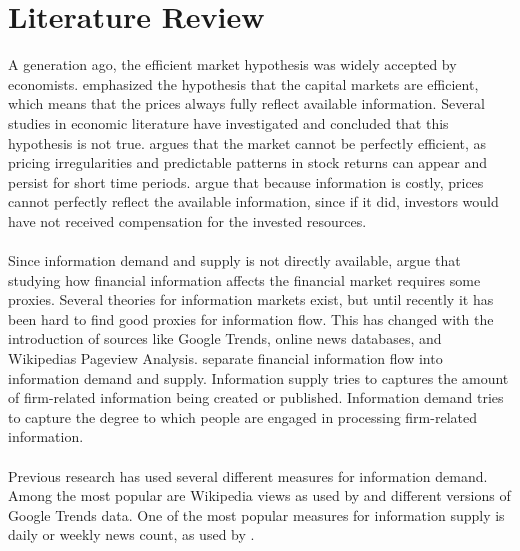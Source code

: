 
\chapter{Literature Review}
A generation ago, the efficient market hypothesis was widely accepted by economists. \cite{fama} emphasized the hypothesis that the capital markets are efficient, which means that the prices always fully reflect available information. Several studies in economic literature have investigated and concluded that this hypothesis is not true. \cite{malkiel} argues that the market cannot be perfectly efficient, as pricing irregularities and predictable patterns in stock returns can appear and persist for short time periods. \cite{grossman} argue that because information is costly, prices cannot perfectly reflect the available information, since if it did, investors would have not received compensation for the invested resources.
\\\\
Since information demand and supply is not directly available,  \cite{vlastakis} argue that studying how financial information affects the financial market requires some proxies. Several theories for information markets exist, but until recently it has been hard to find good proxies for information flow. This has changed with the introduction of sources like Google Trends, online news databases, and Wikipedias Pageview Analysis. \cite{vlastakis} separate financial information flow into information demand and supply. Information supply tries to captures the amount of firm-related information being created or published. Information demand tries to capture the degree to which people are engaged in processing firm-related information.
\\\\
 Previous research has used several different measures for information demand. Among the most popular are Wikipedia views as used by \cite{moat} and different versions of Google Trends data. One of the most popular measures for information supply is daily or weekly news count, as used by \cite{vlastakis}.
\\\\
